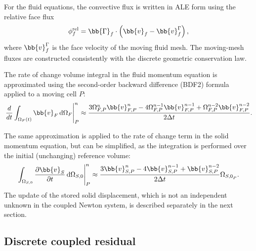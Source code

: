 For the fluid equations, the convective flux is written in ALE form using the relative face flux
\begin{equation}
    \phi_f^\mathrm{rel}
    =
    \bb{\Gamma}_f
    \cdot
    \left(
    \bb{v}_f
    -
    \bb{v}^{\Gamma}_f
    \right),
    \label{qm:eqn:relative_flux}
\end{equation}
where $\bb{v}^{\Gamma}_f$ is the face velocity of the moving fluid mesh. The
moving-mesh fluxes are constructed consistently with the discrete geometric
conservation law.

The rate of change volume integral in the fluid momentum equation is approximated using the second-order backward difference (BDF2) formula applied to a moving cell $P$:
\begin{equation}
    \left.
    \frac{d}{dt}
    \int_{\Omega_F(t)}
    \bb{v}_F
    \, \text{d}\Omega_F
    \right|_P^n
    \approx
    \frac{
    3 \Omega_{F,P}^{n} \bb{v}_{F,P}^{n}
    -
    4 \Omega_{F,P}^{n-1} \bb{v}_{F,P}^{n-1}
    +
    \Omega_{F,P}^{n-2} \bb{v}_{F,P}^{n-2}
    }
    {2\Delta t}.
    \label{qm:eqn:moving_mesh_bdf2_time_term}
\end{equation}

The same approximation is applied to the rate of change term in the solid momentum equation, but can be simplified, as the integration is performed over the initial (unchanging) reference volume:
\begin{equation}
    \left.
    \int_{\Omega_{S,0}}
    \frac{\partial \bb{v}_S}{\partial t}
    \, \text{d}\Omega_{S,0}
    \right|^{n}_P
    \approx
    \frac{
    3\bb{v}^{n}_{S,P}
    -
    4\bb{v}^{n-1}_{S,P}
    +
    \bb{v}^{n-2}_{S,P}
    }
    {2\Delta t}
    \Omega_{{S,0}_P}.
    \label{qm:eqn:bdf2}
\end{equation}
The update of the stored solid displacement, which is not an independent unknown in the coupled Newton system, is described separately in the next section.


\subsection{Discrete coupled residual}
\label{qm:sec:discrete_coupled_residual}

